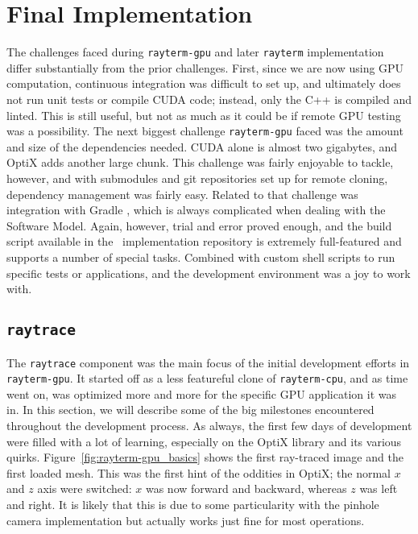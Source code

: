 \section{Final Implementation}\label{ch:implementation:final}

The challenges faced during \texttt{rayterm-gpu} and later \texttt{rayterm} implementation differ substantially from the prior challenges.
First, since we are now using GPU computation, continuous integration was difficult to set up, and ultimately does not run unit tests or compile CUDA code; instead, only the C++ is compiled and linted.
This is still useful, but not as much as it could be if remote GPU testing was a possibility.
The next biggest challenge \texttt{rayterm-gpu} faced was the amount and size of the dependencies needed.
CUDA alone is almost two gigabytes, and OptiX adds another large chunk.
This challenge was fairly enjoyable to tackle, however, and with submodules and git repositories set up for remote cloning, dependency management was fairly easy.
Related to that challenge was integration with Gradle \cite{gradle}, which is always complicated when dealing with the Software Model.
Again, however, trial and error proved enough, and the build script available in the \name\ implementation repository \cite{raytermGpuImpl} is extremely full-featured and supports a number of special tasks.
Combined with custom shell scripts to run specific tests or applications, and the development environment was a joy to work with.


\subsection{\texttt{raytrace}}\label{ch:implementation:final:raytrace}

The \texttt{raytrace} component was the main focus of the initial development efforts in \texttt{rayterm-gpu}.
It started off as a less featureful clone of \texttt{rayterm-cpu}, and as time went on, was optimized more and more for the specific GPU application it was in.
In this section, we will describe some of the big milestones encountered throughout the development process.
As always, the first few days of development were filled with a lot of learning, especially on the OptiX library and its various quirks.
Figure~\ref{fig:rayterm-gpu_basics} shows the first ray-traced image and the first loaded mesh.
This was the first hint of the oddities in OptiX; the normal $x$ and $z$ axis were switched: $x$ was now forward and backward, whereas $z$ was left and right.
It is likely that this is due to some particularity with the pinhole camera implementation but actually works just fine for most operations.

